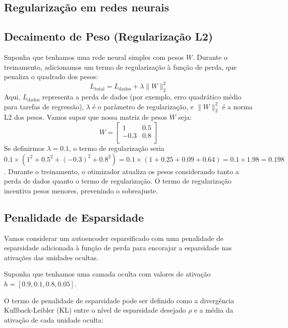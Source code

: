 \begin{apendicesenv}
	\chapter{Regularização em redes neurais}
	\label{chap:regularizacao}

	\section{Decaimento de Peso (Regularização L2)}
		\label{Apend:regularization}
		\par Suponha que tenhamos uma rede neural simples com pesos \( W \). Durante o treinamento, adicionamos um termo de regularização à função de perda, que penaliza o quadrado dos pesos:
		\begin{equation}
			L_{\text{total}} = L_{\text{dados}} + \lambda \|W\|^2_2
		\end{equation}
		Aqui, \( L_{\text{dados}} \) representa a perda de dados (por exemplo, erro quadrático médio para tarefas de regressão), \( \lambda \) é o parâmetro de regularização, e \( \|W\|^2_2 \) é a norma L2 dos pesos.
		Vamos supor que nossa matriz de pesos \( W \) seja:
		\[ W = \begin{bmatrix} 
			1 & 0.5 \\
			-0.3 & 0.8 \\
		\end{bmatrix} \]
		Se definirmos \( \lambda = 0.1 \), o termo de regularização seria \( 0.1 \times (1^2 + 0.5^2 + (-0.3)^2 + 0.8^2) = 0.1 \times (1 + 0.25 + 0.09 + 0.64) = 0.1 \times 1.98 = 0.198 \).
		Durante o treinamento, o otimizador atualiza os pesos considerando tanto a perda de dados quanto o termo de regularização. O termo de regularização incentiva pesos menores, prevenindo o sobreajuste.

	\section{Penalidade de Esparsidade}
		\par Vamos considerar um autoencoder esparsificado com uma penalidade de esparsidade adicionada à função de perda para encorajar a esparsidade nas ativações das unidades ocultas.


		\par Suponha que tenhamos uma camada oculta com valores de ativação \( h = [0.9, 0.1, 0.8, 0.05] \).

		\par O termo de penalidade de esparsidade pode ser definido como a divergência Kullback-Leibler (KL) entre o nível de esparsidade desejado \( \rho \) e a média da ativação de cada unidade oculta:
			

\end{apendicesenv}
